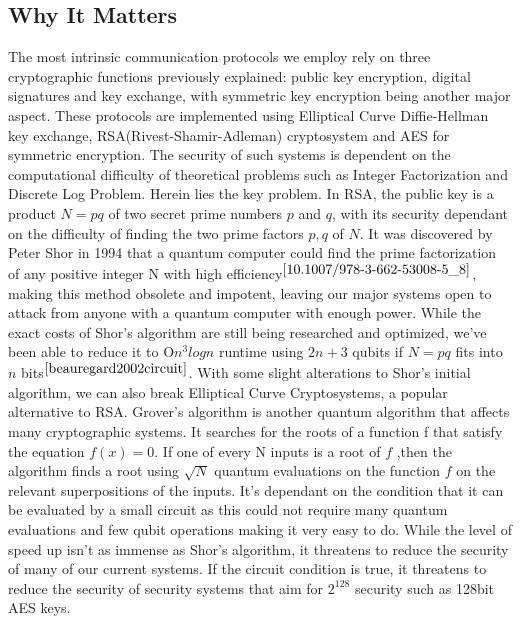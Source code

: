 \documentclass[10pt,a4paper]{IEEEtran}
\begin{document}
\subsection{Why It Matters}
The most intrinsic communication protocols we employ rely on three cryptographic functions previously explained: public key encryption, digital signatures and key exchange, with symmetric key encryption being another major aspect. These protocols are implemented using Elliptical Curve Diffie-Hellman key exchange, RSA(Rivest-Shamir-Adleman) cryptosystem and AES for symmetric encryption. The security of such systems is dependent on the computational difficulty of theoretical problems such as Integer Factorization and Discrete Log Problem.
\newline
Herein lies the key problem. In RSA, the public key is a product \(N = pq\) of two secret prime numbers \(p\) and \(q\), with its security dependant on the difficulty of finding the two prime factors \(p,q\) of \(N\). It was discovered by Peter Shor in 1994 that a quantum computer could find the prime factorization of any positive integer N with high efficiency\(^{\cite{10.1007/978-3-662-53008-5_8}}\),  making this method obsolete and impotent, leaving our major systems open to attack from anyone with a quantum computer with enough power. While the exact costs of Shor's algorithm are still being researched and optimized, we've been able to reduce it to O\(n^3logn\) runtime using \(2n + 3\) qubits if \(N=pq\) fits into \(n\) bits\(^{\cite{beauregard2002circuit}}\). With some slight alterations to Shor's initial algorithm, we can also break Elliptical Curve Cryptosystems, a popular alternative to RSA. 
\newline
\newline
Grover's algorithm is another quantum algorithm that affects many cryptographic systems. It searches for the roots of a function f that satisfy the equation \(f(x) = 0\). If one of every N inputs is a root of \(f\) ,then the algorithm finds a root using \(\sqrt{N}\) quantum evaluations on the function \(f\) on the relevant superpositions of the inputs. It's dependant on the condition that it can be evaluated by a small circuit as this could not require many quantum evaluations and few qubit operations making it very easy to do. While the level of speed up isn't as immense as Shor's algorithm, it threatens to reduce the security of many of our current systems. If the circuit condition is true, it threatens to reduce the security of security systems that aim for \(2^128\) security such as 128bit AES keys. 
\end{document}
